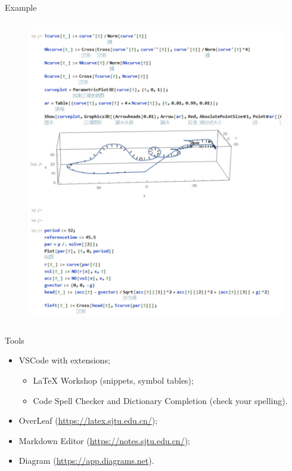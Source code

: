 \documentclass{beamer}
\begin{document}
\begin{frame}{Example}
\begin{columns}
\begin{column}{0.5\linewidth}
\begin{figure}[htbp]
                \includegraphics[width=\textwidth]{img/code.jpg}
            \end{figure}
        \end{column}
    \end{columns}
\end{frame}

\begin{frame}{Tools}
    \begin{itemize}
        \item VSCode with extensions;
        \begin{itemize}
            \item LaTeX Workshop (snippets, symbol tables);
            \item Code Spell Checker and Dictionary Completion (check your spelling).
        \end{itemize}
        \item OverLeaf (\url{https://latex.sjtu.edu.cn/});
        \item Markdown Editor (\url{https://notes.sjtu.edu.cn/});
        \item Diagram (\url{https://app.diagrams.net}).      
    \end{itemize}
\end{frame}
\end{document}
